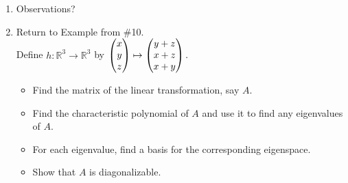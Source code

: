 \documentclass[11pt,fleqn]{article}
\begin{document}
\begin{enumerate}
\begin{enumerate}
 \end{enumerate}
 \item Observations?
 \vfill
 \newpage
 \item Return to Example from \#10. \\Define $h:\mathbb{R}^3 \to \mathbb{R}^3$ by $\begin{pmatrix} x\\y\\z \end{pmatrix} \mapsto \begin{pmatrix} y+z \\ x+z \\ x+y \end{pmatrix}.$\\
 \begin{itemize}
 \item Find the matrix of the linear transformation, say $A.$ 
 \item Find the characteristic polynomial of $A$ and use it to find any eigenvalues of $A$. 
 \item For each eigenvalue, find a basis for the corresponding eigenspace. 
 \item Show that $A$ is diagonalizable.
 \end{itemize}

   \end{enumerate}
  
\end{document}
